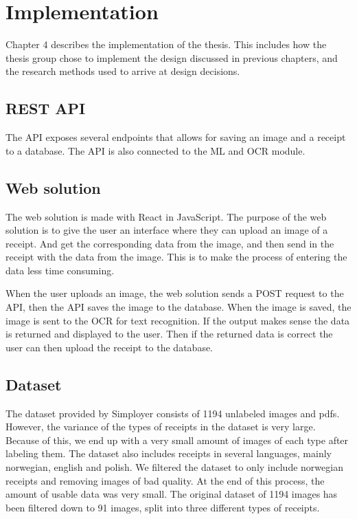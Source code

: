 \cleardoublepage
\chapter{Implementation}
\label{ch:implementation}
Chapter 4 describes the implementation of the thesis.
This includes how the thesis group chose to implement the design discussed in previous chapters, and the research methods used to arrive at design decisions.

\section{REST API}\label{sec:REST API}

The API exposes several endpoints that allows for saving an image and a receipt to a database.
The API is also connected to the ML and OCR module.

\section{Web solution}\label{sec:Web solution}

The web solution is made with React in JavaScript.
The purpose of the web solution is to give the user an interface where they can upload an image of a receipt.
And get the corresponding data from the image, and then send in the receipt with the data from the image.
This is to make the process of entering the data less time consuming.

When the user uploads an image, the web solution sends a POST request to the API, then the API saves the image to
the database.
When the image is saved, the image is sent to the OCR for text recognition.
If the output makes sense the data is returned and displayed to the user.
Then if the returned data is correct the user can then upload the receipt to the database.

\section{Dataset}\label{dataset}

The dataset provided by Simployer consists of 1194 unlabeled images and pdfs.
However, the variance of the types of receipts in the dataset is very large.
Because of this, we end up with a very small amount of images of each type after labeling them.
The dataset also includes receipts in several languages, mainly norwegian, english and polish.
We filtered the dataset to only include norwegian receipts and removing images of bad quality.
At the end of this process, the amount of usable data was very small.
The original dataset of 1194 images has been filtered down to 91 images, split into three different types of receipts.

